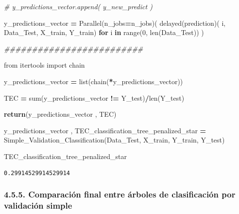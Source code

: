 \documentclass[
  11pt,
  a4paper,
]{article}
\newenvironment{Shaded}{\begin{snugshade}}{\end{snugshade}}
\newcommand{\BuiltInTok}[1]{#1}
\newcommand{\CommentTok}[1]{\textcolor[rgb]{0.56,0.35,0.01}{\textit{#1}}}
\newcommand{\ControlFlowTok}[1]{\textcolor[rgb]{0.13,0.29,0.53}{\textbf{#1}}}
\newcommand{\DecValTok}[1]{\textcolor[rgb]{0.00,0.00,0.81}{#1}}
\newcommand{\ImportTok}[1]{#1}
\newcommand{\KeywordTok}[1]{\textcolor[rgb]{0.13,0.29,0.53}{\textbf{#1}}}
\newcommand{\NormalTok}[1]{#1}
\newcommand{\OperatorTok}[1]{\textcolor[rgb]{0.81,0.36,0.00}{\textbf{#1}}}
\begin{document}
\begin{Shaded}
\begin{Highlighting}[]
        \CommentTok{\# y\_predictions\_vector.append( y\_new\_predict )}

    
\NormalTok{    y\_predictions\_vector }\OperatorTok{=}\NormalTok{ Parallel(n\_jobs}\OperatorTok{=}\NormalTok{n\_jobs)( delayed(prediction)( i, Data\_Test, X\_train, Y\_train) }\ControlFlowTok{for}\NormalTok{ i }\KeywordTok{in} \BuiltInTok{range}\NormalTok{(}\DecValTok{0}\NormalTok{, }\BuiltInTok{len}\NormalTok{(Data\_Test)) )}

    \CommentTok{\#\#\#\#\#\#\#\#\#\#\#\#\#\#\#\#\#\#\#\#\#\#\#\#\#}

    \ImportTok{from}\NormalTok{ itertools }\ImportTok{import}\NormalTok{ chain}

\NormalTok{    y\_predictions\_vector }\OperatorTok{=} \BuiltInTok{list}\NormalTok{(chain(}\OperatorTok{*}\NormalTok{y\_predictions\_vector))}

 
\NormalTok{    TEC }\OperatorTok{=} \BuiltInTok{sum}\NormalTok{(y\_predictions\_vector }\OperatorTok{!=}\NormalTok{ Y\_test)}\OperatorTok{/}\BuiltInTok{len}\NormalTok{(Y\_test)    }

 
    \ControlFlowTok{return}\NormalTok{(y\_predictions\_vector , TEC)}
\end{Highlighting}
\end{Shaded}

\vspace{0.25cm}

\begin{Shaded}
\begin{Highlighting}[]
\NormalTok{y\_predictions\_vector , TEC\_classification\_tree\_penalized\_star }\OperatorTok{=}\NormalTok{ Simple\_Validation\_Classification(Data\_Test, X\_train, Y\_train, Y\_test)}
\end{Highlighting}
\end{Shaded}

\begin{Shaded}
\begin{Highlighting}[]
\NormalTok{TEC\_classification\_tree\_penalized\_star}
\end{Highlighting}
\end{Shaded}

\begin{verbatim}
0.29914529914529914
\end{verbatim}

\newpage

\hypertarget{comparaciuxf3n-final-entre-uxe1rboles-de-clasificaciuxf3n-por-validaciuxf3n-simple}{%
\subsubsection{\texorpdfstring{4.5.5. Comparación final entre árboles de
clasificación por validación simple
}{4.5.5. Comparación final entre árboles de clasificación por validación simple }}\label{comparaciuxf3n-final-entre-uxe1rboles-de-clasificaciuxf3n-por-validaciuxf3n-simple}}
\end{document}
